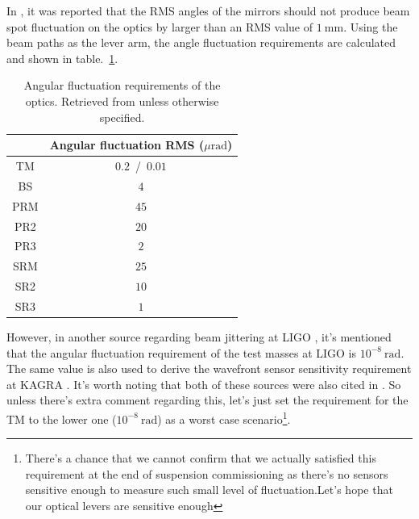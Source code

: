 In \cite{Sekiguchi:2016bmv}, it was reported that the RMS angles of the mirrors should not produce beam spot fluctuation on the optics by larger than an RMS value of $1~\mathrm{mm}$.
Using the beam paths as the lever arm, the angle fluctuation requirements are calculated and shown in table.~\ref{table:angular_fluctuation_requirement}.
\begin{table}[!h]
	\centering
	\begin{tabular}{|c|c|}
		\hline
		& Angular fluctuation RMS ($\mu\mathrm{rad}$)\\
		\hline
		TM &  $0.2$\cite{Sekiguchi:2016bmv, yuta_oplev}~/~$0.01$\cite{PhysRevD.88.043007, Mueller:05}\\
		\hline
		BS &  $4$\\
		\hline
		PRM & $45$\\
		\hline
		PR2 & $20$\\ 
		\hline
		PR3 & $2$\\
		\hline
		SRM & $25$\\
		\hline
		SR2 & $10$\\
		\hline
		SR3 & $1$\\
		\hline
	\end{tabular}
	\caption{Angular fluctuation requirements of the optics. Retrieved from \cite{Sekiguchi:2016bmv, yuta_oplev} unless otherwise specified.}
	\label{table:angular_fluctuation_requirement}
\end{table}
However, in another source regarding beam jittering at LIGO \cite{Mueller:05}, it's mentioned that the angular fluctuation requirement of the test masses at LIGO is $10^{-8}~\mathrm{rad}$.
The same value is also used to derive the wavefront sensor sensitivity requirement at KAGRA \cite{PhysRevD.88.043007}.
It's worth noting that both of these sources were also cited in \cite{Sekiguchi:2016bmv}.
So unless there's extra comment regarding this, let's just set the requirement for the TM to the lower one ($10^{-8}~\mathrm{rad}$) as a worst case scenario\footnote{There's a chance that we cannot confirm that we actually satisfied this requirement at the end of suspension commissioning as there's no sensors sensitive enough to measure such small level of fluctuation.Let's hope that our optical levers are sensitive enough}.

